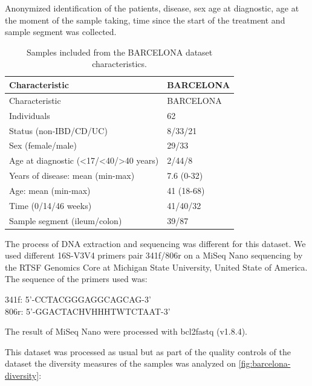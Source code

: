 \documentclass[
  12pt,
  a4paper,
  twoside,
  openright]{book}
\begin{document}
Anonymized identification of the patients, disease, sex age at diagnostic, age at the moment of the sample taking, time since the start of the treatment and sample segment was collected.

\begin{longtable}[]{@{}ll@{}}
\caption{\label{tab:BARCELONA} Samples included from the BARCELONA dataset characteristics.}\tabularnewline
\toprule
Characteristic & BARCELONA \\
\midrule
\endfirsthead
\toprule
Characteristic & BARCELONA \\
\midrule
\endhead
Individuals & 62 \\
Status (non-IBD/CD/UC) & 8/33/21 \\
Sex (female/male) & 29/33 \\
Age at diagnostic (\textless17/\textless40/\textgreater40 years) & 2/44/8 \\
Years of disease: mean (min-max) & 7.6 (0-32) \\
Age: mean (min-max) & 41 (18-68) \\
Time (0/14/46 weeks) & 41/40/32 \\
Sample segment (ileum/colon) & 39/87 \\
\bottomrule
\end{longtable}

The process of DNA extraction and sequencing was different for this dataset.
We used different 16S-V3V4 primers pair 341f/806r on a MiSeq Nano sequencing by the RTSF Genomics Core at Michigan State University, United State of America.
The sequence of the primers used was:

341f: 5'-CCTACGGGAGGCAGCAG-3'\\
806r: 5'-GGACTACHVHHHTWTCTAAT-3'

The result of MiSeq Nano were processed with bcl2fastq (v1.8.4).

This dataset was processed as usual but as part of the quality controls of the dataset the diversity measures of the samples was analyzed on \ref{fig:barcelona-diversity}:
\end{document}
